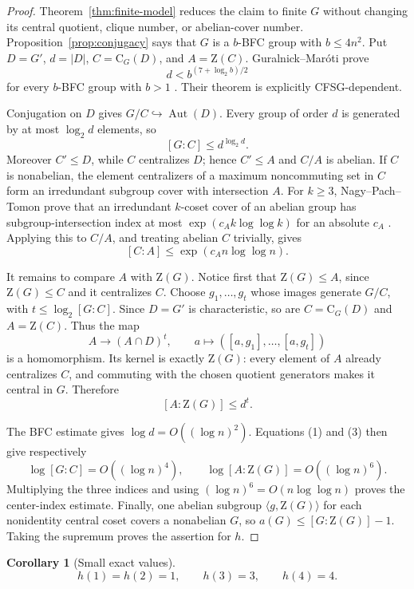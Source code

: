 \documentclass[11pt]{article}
\newtheorem{corollary}[theorem]{Corollary}
\theoremstyle{remark}
\newcommand{\aG}{a}
\newcommand{\Z}{\mathrm Z}
\newcommand{\CG}{\mathrm C}
\begin{document}
\begin{proof}
Theorem~\ref{thm:finite-model} reduces the claim to finite $G$ without
changing its central quotient, clique number, or abelian-cover number.
Proposition~\ref{prop:conjugacy} says that $G$ is a $b$-BFC group with
$b\le4n^2$.  Put $D=G'$, $d=|D|$, $C=\CG_G(D)$, and $A=\Z(C)$.
Guralnick--Mar\'oti prove
\[
 d<b^{(7+\log_2b)/2}
\]
for every $b$-BFC group with $b>1$
\cite[Theorem~1.8]{guralnick_maroti_2011}.  Their theorem is explicitly
CFSG-dependent.

Conjugation on $D$ gives $G/C\hookrightarrow\operatorname{Aut}(D)$.
Every group of order $d$ is generated by at most $\log_2d$ elements, so
\[
 [G:C]\le d^{\log_2d}.
\tag{1}
\]
Moreover $C'\le D$, while $C$ centralizes $D$; hence $C'\le A$ and $C/A$
is abelian.  If $C$ is nonabelian, the element centralizers of a maximum
noncommuting set in $C$ form an irredundant subgroup cover with intersection
$A$.  For $k\ge3$, Nagy--Pach--Tomon prove that an irredundant
$k$-coset cover of an abelian group has subgroup-intersection index at most
$\exp(c_Ak\log\log k)$ for an absolute $c_A$
\cite[Theorem~1.11 and Section~8, author-manuscript pp.~14--16]
{nagy_pach_tomon_2026}.  Applying this to $C/A$, and treating abelian $C$
trivially, gives
\[
 [C:A]\le\exp(c_A n\log\log n).
\tag{2}
\]

It remains to compare $A$ with $\Z(G)$.  Notice first that
$\Z(G)\le A$, since $\Z(G)\le C$ and it centralizes $C$.  Choose
$g_1,\ldots,g_t$ whose
images generate $G/C$, with $t\le\log_2[G:C]$.  Since $D=G'$ is
characteristic, so are $C=\CG_G(D)$ and $A=\Z(C)$.  Thus the map
\[
 A\longrightarrow(A\cap D)^t,
 \qquad a\longmapsto([a,g_1],\ldots,[a,g_t])
\]
is a homomorphism.  Its kernel is exactly $\Z(G)$: every element of $A$
already centralizes $C$, and commuting with the chosen quotient generators
makes it central in $G$.  Therefore
\[
 [A:\Z(G)]\le d^t.
\tag{3}
\]

The BFC estimate gives $\log d=O((\log n)^2)$.  Equations (1) and (3) then
give respectively
\[
 \log[G:C]=O((\log n)^4),\qquad
 \log[A:\Z(G)]=O((\log n)^6).
\]
Multiplying the three indices and using
$(\log n)^6=O(n\log\log n)$ proves the center-index estimate.  Finally,
one abelian subgroup $\langle g,\Z(G)\rangle$ for each nonidentity central
coset covers a nonabelian $G$, so
$\aG(G)\le[G:\Z(G)]-1$.  Taking the supremum proves the assertion for
$h$.
\end{proof}

\begin{corollary}[Small exact values]\label{cor:small}
\[
 h(1)=h(2)=1,\qquad h(3)=3,\qquad h(4)=4.
\]
\end{corollary}
\end{document}
